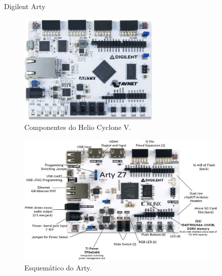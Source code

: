     \begin{frame}{Digilent Arty}
    \vspace{-0.5em}
        \begin{figure}[h]
            \centering
            \includegraphics[width=0.6\textwidth]{img/imobilis/arty1.png}
            \caption{Componentes do Helio Cyclone V.}
            \label{fig:arty1}
        \end{figure}
    \end{frame}
    
    \begin{frame}%
        \begin{figure}[h]
        \centering
        \includegraphics[width=0.9\textwidth]{img/imobilis/arty2.jpg}
        \caption{Esquemático do Arty.}
        \label{fig:arty2}
        \end{figure}
    \end{frame}

